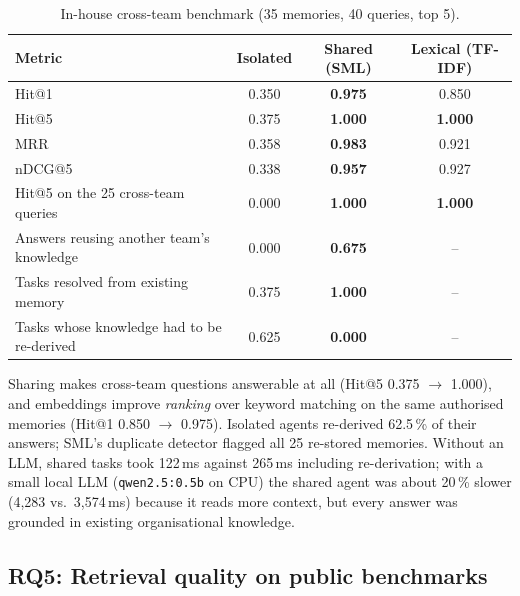\documentclass[11pt,a4paper]{article}
\theoremstyle{remark}
\newcommand{\sys}{SML}
\newcommand{\best}[1]{\textbf{#1}}
\begin{document}
\begin{table}[htbp]
\centering
\small
\caption{In-house cross-team benchmark (35 memories, 40 queries, top 5).}
\label{tab:inhouse}
\begin{tabular}{@{}lccc@{}}
\toprule
Metric & Isolated & \textbf{Shared (\sys{})} & Lexical (TF-IDF) \\
\midrule
Hit@1 & 0.350 & \best{0.975} & 0.850 \\
Hit@5 & 0.375 & \best{1.000} & \best{1.000} \\
MRR & 0.358 & \best{0.983} & 0.921 \\
nDCG@5 & 0.338 & \best{0.957} & 0.927 \\
Hit@5 on the 25 cross-team queries & 0.000 & \best{1.000} & \best{1.000} \\
Answers reusing another team's knowledge & 0.000 & \best{0.675} & -- \\
\midrule
Tasks resolved from existing memory & 0.375 & \best{1.000} & -- \\
Tasks whose knowledge had to be re-derived & 0.625 & \best{0.000} & -- \\
\bottomrule
\end{tabular}
\end{table}

Sharing makes cross-team questions answerable at all (Hit@5 0.375 $\rightarrow$ 1.000), and embeddings improve
\emph{ranking} over keyword matching on the same authorised memories (Hit@1 0.850 $\rightarrow$ 0.975). Isolated agents
re-derived 62.5\,\% of their answers; \sys{}'s duplicate detector flagged all 25 re-stored memories. Without an LLM,
shared tasks took 122\,ms against 265\,ms including re-derivation; with a small local LLM (\texttt{qwen2.5:0.5b} on CPU)
the shared agent was about 20\,\% slower (4{,}283 vs.\ 3{,}574\,ms) because it reads more context, but every answer was
grounded in existing organisational knowledge.

\subsection{RQ5: Retrieval quality on public benchmarks}
\label{sec:rq5}
\end{document}
